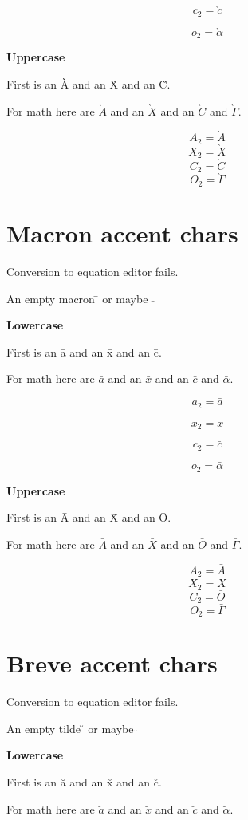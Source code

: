 \documentclass{article}
\begin{document}
$$c_2=\grave{c}$$

$$o_2=\grave{\alpha}$$

\textbf{Uppercase}

First is an \`{A} and an \`{X} and an \`{C}.

For math here are $\grave{A}$ and an $\grave{X}$ and an $\grave{C}$ and $\grave{\Gamma}$.

$$A_2=\grave{A}$$
$$X_2=\grave{X}$$
$$C_2=\grave{C}$$
$$O_2=\grave{\Gamma}$$




\section{Macron accent chars}

Conversion to equation editor fails.

An empty macron \={} or maybe $\bar{}$

\textbf{Lowercase}

First is an \={a} and an \={x} and an \={c}.

For math here are $\bar{a}$ and an $\bar{x}$ and an $\bar{c}$ and $\bar{\alpha}$.

$$a_2=\bar{a}$$

$$x_2=\bar{x}$$

$$c_2=\bar{c}$$

$$o_2=\bar{\alpha}$$

\textbf{Uppercase}

First is an \={A} and an \={X} and an \={O}.

For math here are $\bar{A}$ and an $\bar{X}$ and an $\bar{O}$ and $\bar{\Gamma}$.

$$A_2=\bar{A}$$
$$X_2=\bar{X}$$
$$C_2=\bar{O}$$
$$O_2=\bar{\Gamma}$$




\section{Breve accent chars}

Conversion to equation editor fails.

An empty tilde \u{} or maybe $\breve{}$

\textbf{Lowercase}

First is an \u{a} and an \u{x} and an \u{c}.

For math here are $\breve{a}$ and an $\breve{x}$ and an $\breve{c}$ and $\breve{\alpha}$.
\end{document}

